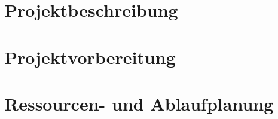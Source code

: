 
\section{Projektbeschreibung}


\section{Projektvorbereitung}


\section{Ressourcen- und Ablaufplanung}

